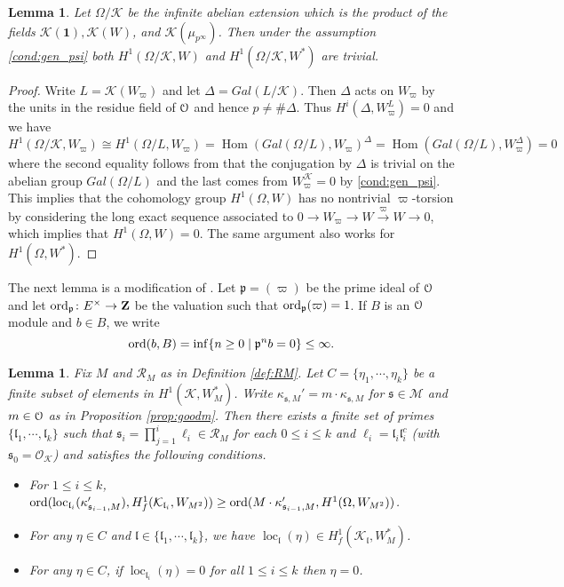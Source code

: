 \documentclass[leqno]{amsart}
\newtheorem{lem}[thm]{Lemma}
\theoremstyle{definition}
\theoremstyle{remark}
\newcommand{\id}{\mathbf{1}}
\newcommand{\oo}{\mathcal{O}}
\newcommand{\eo}{\EuScript{O}}
\newcommand{\Z}{{\mathbf{Z}}}
\DeclareMathOperator{\Hom}{Hom}
\newcommand{\fl}{\mathfrak{l}}
\newcommand{\fp}{\mathfrak{p}}
\newcommand{\fs}{\mathfrak{s}}
\newcommand{\K}{{\mathcal{K}}} %
\newcommand{\ord}{\textnormal{ord}} %
\DeclareMathOperator{\loc}{loc}
\begin{document}
\begin{lem}\label{lem:vanish}
    Let $\Omega/\K$ be the infinite abelian extension
    which is the product of the fields
    $\K(\id), \K(W)$, and $\K(\mu_{p^\infty})$.
    Then under the assumption \eqref{cond:gen_psi} both 
    $H^1(\Omega/\K, W)$ and $H^1(\Omega/\K, W^*)$ 
	are trivial.
\end{lem}
\begin{proof}
    Write $L=\K(W_{\varpi})$ and let $\Delta=Gal(L/\K)$.
    Then $\Delta$ acts on $W_{\varpi}$
    by the units in the residue field of $\eo$
    and hence $p\neq \#\Delta$.
    Thus $H^i(\Delta, W_\varpi^L)=0$ and we have
	\[
		H^1(\Omega/\K,W_{\varpi})\cong
		H^1(\Omega/L,W_{\varpi})=
		\Hom(Gal(\Omega/L),W_{\varpi})^\Delta=
		\Hom(Gal(\Omega/L),W_{\varpi}^\Delta)=0
	\]
    where the second equality follows from that
    the conjugation by $\Delta$ 
    is trivial on the abelian group $Gal(\Omega/L)$
    and the last comes from 
    $W_{\varpi}^\K=0$ by \eqref{cond:gen_psi}.
    This implies that the cohomology group 
    $H^1(\Omega,W)$
	has no nontrivial $\varpi$-torsion
    by considering the long exact sequence associated to
	$0\to W_\varpi\to W\xrightarrow{\varpi}W\to 0$,
    which implies that $H^1(\Omega,W)=0$.
	The same argument also works for $H^1(\Omega,W^*)$.
\end{proof}

The next lemma is a modification of \cite[Lem 5.2.3]{Rubin}.
Let $\fp=(\varpi)$ be the prime ideal of $\eo$
and let $\ord_\fp\colon E^\times\to \Z$ be the valuation 
such that $\ord_\fp(\varpi)=1$.
If $B$ is an $\eo$ module and $b\in B$, we write
\[
    \ord(b,B)=\inf\{n\geq0\mid \fp^nb=0\}\leq\infty.
\]

\begin{lem}\label{lem:dualC}
Fix $M$ and $\mathcal{R}_M$ as in Definition \ref{def:RM}.
Let  $C=\{\eta_1,\cdots,\eta_k\}$
be a finite subset of elements in $H^1(\K,W_{M}^*)$.
Write $\kappa_{\fs,M}'=m\cdot \kappa_{\fs,M}$
for $\fs\in \mathcal{M}$ and $m\in \eo$
as in Proposition \ref{prop:goodm}.
Then there exists a finite set of primes
$\{\fl_1,\cdots,\fl_k\}$  such that 
$\fs_i=\prod_{j=1}^i\ell_i\in \mathcal{R}_M$
for each $0\leq i\leq k$ and $\ell_i=\fl_i\fl_i^c$
(with $\fs_0=\oo_\K$) and satisfies the following conditions.
\begin{itemize}
\item For $1\leq i\leq k$,
$\textnormal{ord}( \loc_{\fl_i}(\kappa_{\fs_{i-1},M}'),
H^1_f(\K_{\fl_i}, W_{M^2}))\geq
\textnormal{ord}( M\cdot \kappa_{\fs_{i-1},M}', H^1(\Omega,W_{M^2}))$.
\item For any $\eta\in C$ and $\fl\in \{\fl_1,\cdots,\fl_k\}$,
we have $\loc_\fl(\eta)\in H^1_f(\K_{\fl},W_{M}^*)$.
\item For any $\eta\in C$,
if $\loc_{\fl_i}(\eta)=0$ for all $1\leq i\leq k$ then $\eta=0$.
\end{itemize}

\end{lem}
\end{document}
